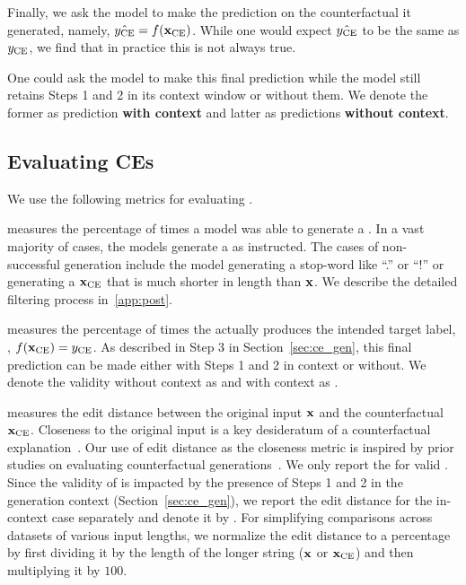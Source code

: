 Finally, we ask the model to make the prediction on the counterfactual it generated, namely, $\hat{y_{\text{CE}}} = f(\mathbf{x}_{\text{CE}})$. While one would expect $\hat{y_{\text{CE}}}$ to be the same as $y_{\text{CE}}$, we find that in practice this is not always true.

One could ask the model to make this final prediction while the model still retains Steps 1 and 2 in its context window or 
without them. We denote the former as prediction \textbf{with context} and latter as predictions \textbf{without context}. 


\subsection{Evaluating CEs}
\label{sec:ce_eval}

We use the following metrics for evaluating \SCEs.

  measures the percentage of times a model was able to generate a \SCE. In a vast majority of cases, the models generate a \SCE as instructed. The cases of non-successful generation include the model generating a stop-word like ``.'' or ``!'' or generating a $\mathbf{x}_{\text{CE}}$ that is much shorter in length than $\mathbf{x}$. We describe the detailed filtering process in~\autoref{app:post}.


 measures the percentage of times the \SCE actually produces the intended target label, \ie, $f(\mathbf{x}_{\text{CE}}) = y_{\text{CE}}$. As described in Step 3 in Section~\ref{sec:ce_gen}, this final prediction can be made either with Steps 1 and 2 in context or without. We denote the validity without context as \Val and with context as \ValH.


  measures the edit distance between the original input $\mathbf{x}$ and the counterfactual $\mathbf{x}_{\text{CE}}$.
Closeness to the original input is a key desideratum of a counterfactual explanation~\cite{wachter2017counterfactual}. Our use of edit distance as the closeness metric is inspired by prior studies on evaluating counterfactual generations~\cite{chatzi2025ce}.
We only report the \ED for valid \SCEs. 
Since the validity of \SCEs is impacted by the presence of Steps 1 and 2 in the generation context (Section~\ref{sec:ce_gen}), we report the edit distance for the in-context case separately and denote it by \EDH.
For simplifying comparisons across datasets of various input lengths, we normalize the edit distance to a percentage by first dividing it by the length of the longer string ($\mathbf{x}$ or $\mathbf{x}_{\text{CE}}$) and then multiplying it by $100$.








